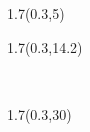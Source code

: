 
\begingroup

\textblockorigin{0mm}{0mm}

\begin{textblock*}{1.7\TPHorizModule}(0.3\TPHorizModule,5\TPVertModule)
  \begin{minipage}{\textwidth}
    \theauthor
  \end{minipage}
\end{textblock*}

\begin{textblock*}{1.7\TPHorizModule}(0.3\TPHorizModule,14.2\TPVertModule)
  \begin{minipage}{\textwidth}
    \thetitle \\
  \end{minipage}
\end{textblock*}

\begin{textblock*}{1.7\TPHorizModule}(0.3\TPHorizModule,30\TPVertModule)
  \begin{minipage}{\textwidth}
    \thedate
  \end{minipage}
\end{textblock*}

\endgroup

